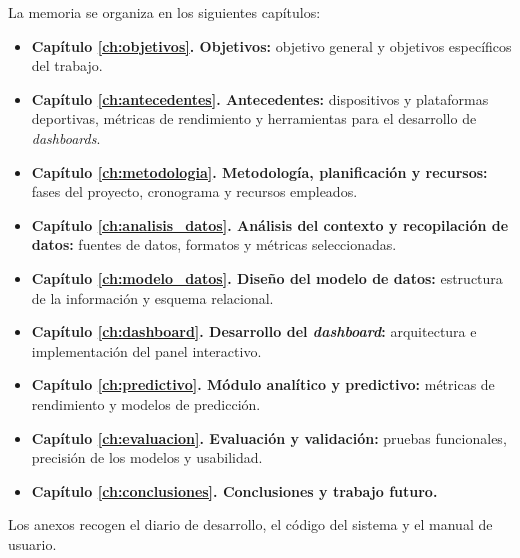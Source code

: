 La memoria se organiza en los siguientes capítulos:

\begin{itemize}
    \item \textbf{Capítulo \ref{ch:objetivos}. Objetivos:} objetivo general y objetivos específicos del trabajo.
    \item \textbf{Capítulo \ref{ch:antecedentes}. Antecedentes:} dispositivos y plataformas deportivas, métricas de rendimiento y herramientas para el desarrollo de \textit{dashboards}.
    \item \textbf{Capítulo \ref{ch:metodologia}. Metodología, planificación y recursos:} fases del proyecto, cronograma y recursos empleados.
    \item \textbf{Capítulo \ref{ch:analisis_datos}. Análisis del contexto y recopilación de datos:} fuentes de datos, formatos y métricas seleccionadas.
    \item \textbf{Capítulo \ref{ch:modelo_datos}. Diseño del modelo de datos:} estructura de la información y esquema relacional.
    \item \textbf{Capítulo \ref{ch:dashboard}. Desarrollo del \textit{dashboard}:} arquitectura e implementación del panel interactivo.
    \item \textbf{Capítulo \ref{ch:predictivo}. Módulo analítico y predictivo:} métricas de rendimiento y modelos de predicción.
    \item \textbf{Capítulo \ref{ch:evaluacion}. Evaluación y validación:} pruebas funcionales, precisión de los modelos y usabilidad.
    \item \textbf{Capítulo \ref{ch:conclusiones}. Conclusiones y trabajo futuro.}
\end{itemize}

Los anexos recogen el diario de desarrollo, el código del sistema y el manual de usuario.
